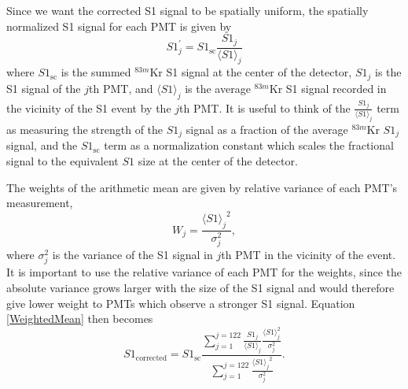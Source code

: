 \documentclass[a4paper,12pt]{article}
\begin{document}
{Since we want the corrected S1 signal to be spatially uniform, the spatially normalized S1 signal for each PMT is given by
\begin{equation}
S1^{\prime}_{j} = S1_{\mbox{sc}} \frac{S1_j}{\langle S1 \rangle_{j}}
\end{equation}
where $S1_{\mbox{sc}}$ is the summed $^{83m}$Kr S1 signal at the center of the detector, $S1_j$ is the S1 signal of the $j$th PMT, and $\langle S1 \rangle_{j}$ is the average $^{83m}$Kr S1 signal recorded in the vicinity of the S1 event by the $j$th PMT.  It is useful to think of the $ \frac{S1_j}{\langle S1 \rangle_{j}}$ term as measuring the strength of the $S1_j$ signal as a fraction of the average $^{83m}$Kr $S1_j$ signal, and the $S1_{\mbox{sc}}$ term as a normalization constant which scales the fractional signal to the equivalent $S1$ size at the center of the detector.

The weights of the arithmetic mean are given by relative variance of each PMT's measurement,
\begin{equation}
W_j=\frac{{\langle S1 \rangle_{j}}^2}{\sigma_j^2},
\end{equation}
where $\sigma_j^2$ is the variance of the S1 signal in $j$th PMT in the vicinity of the event.  It is important to use the relative variance of each PMT for the weights, since the absolute variance grows larger with the size of the S1 signal and would therefore give lower weight to PMTs which observe a stronger S1 signal.  Equation \ref{WeightedMean} then becomes
\begin{equation} \label{WeightedMean2}
S1_{\mbox{corrected}} = S1_{\mbox{sc}} \frac{\sum_{j=1}^{j=122} \frac{S1_j}{\langle S1 \rangle_{j}} \frac{{\langle S1 \rangle_{j}^2}}{\sigma_j^2}} {\sum_{j=1}^{j=122} \frac{{\langle S1 \rangle_{j}}^2}{\sigma_j^2}}.
\end{equation}

}
\end{document}
